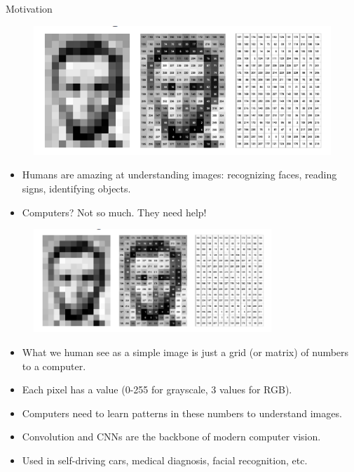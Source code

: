 \begin{frame}[allowframebreaks]{Motivation}
    \begin{figure}
        \centering
        \includegraphics[height=0.9\textheight,width=1\textwidth,keepaspectratio]{images/cnn/represent_image.png}
    \end{figure}

    \begin{itemize}
        \item Humans are amazing at understanding images: recognizing faces, reading signs, identifying objects.
        \item Computers? Not so much. They need help!
    \end{itemize}

    \framebreak

    \begin{figure}
        \centering
        \includegraphics[height=0.8\textheight,width=0.8\textwidth,keepaspectratio]{images/cnn/represent_image.png}
    \end{figure}

    \begin{itemize}
        \item What we human see as a simple image is just a grid (or matrix) of numbers to a computer.
        \item Each pixel has a value (0-255 for grayscale, 3 values for RGB).
        \item Computers need to learn patterns in these numbers to understand images.
        \framebreak
        \item \large Convolution and CNNs are the backbone of modern computer vision.
        \item Used in self-driving cars, medical diagnosis, facial recognition, etc.
    \end{itemize}
\end{frame}

